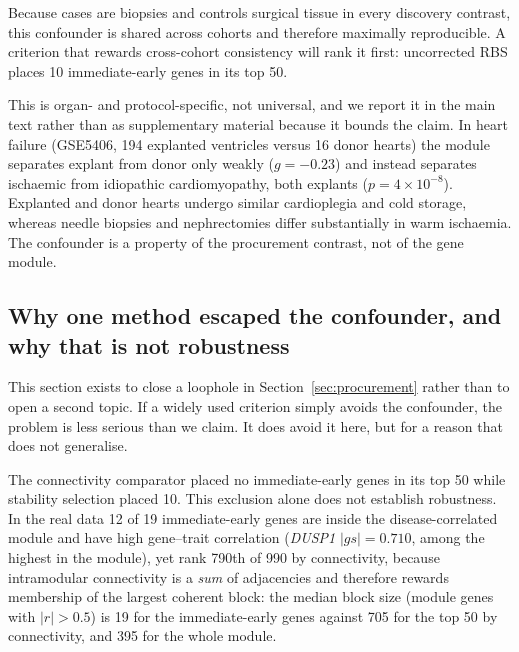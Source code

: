 \documentclass[pdflatex,sn-vancouver-num]{sn-jnl}
\theoremstyle{thmstyleone}
\theoremstyle{thmstyletwo}
\theoremstyle{thmstylethree}
\begin{document}
Because cases are biopsies and controls surgical tissue in every discovery contrast, this
confounder is shared across cohorts and therefore maximally reproducible. A criterion that
rewards cross-cohort consistency will rank it first: uncorrected RBS places 10 immediate-early
genes in its top 50.

This is organ- and protocol-specific, not universal, and we report it in the main text rather
than as supplementary material because it bounds the claim. In heart failure (GSE5406, 194
explanted ventricles versus 16 donor hearts) the module separates explant from donor only weakly
($g = -0.23$) and instead separates ischaemic from idiopathic cardiomyopathy, both explants
($p = 4\times10^{-8}$). Explanted and donor hearts undergo similar cardioplegia and cold storage,
whereas needle biopsies and nephrectomies differ substantially in warm ischaemia. The confounder
is a property of the procurement contrast, not of the gene module.

\subsection{Why one method escaped the confounder, and why that is not
robustness}\label{sec:modulesize}

This section exists to close a loophole in Section~\ref{sec:procurement} rather than to open a
second topic. If a widely used criterion simply avoids the confounder, the problem is less
serious than we claim. It does avoid it here, but for a reason that does not generalise.

The connectivity comparator placed no immediate-early genes in its top 50 while stability
selection placed 10. This exclusion alone does not establish robustness. In the real data 12 of 19 immediate-early genes are inside the disease-correlated
module and have high gene--trait correlation (\textit{DUSP1} $|gs| = 0.710$, among the highest in
the module), yet rank 790th of 990 by connectivity, because intramodular connectivity is a
\emph{sum} of adjacencies and therefore rewards membership of the largest coherent block: the
median block size (module genes with $|r| > 0.5$) is 19 for the immediate-early genes against 705
for the top 50 by connectivity, and 395 for the whole module.
\end{document}
